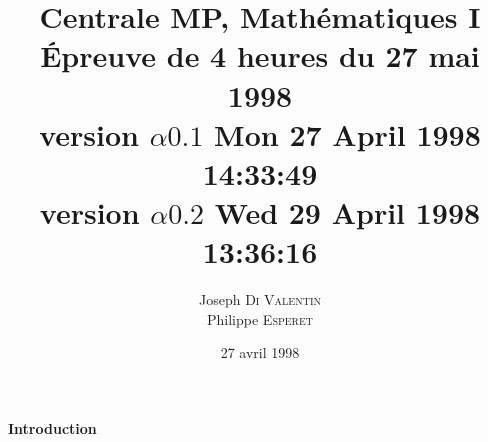 \documentclass[a4paper]{article}
\begin{document}

\def\RR{\mathbf{R}}
\def\ZZ{\mathbf{Z}}
\def\NN{\mathbf{N}}

\title{Centrale MP, Math\'ematiques I\\
       \'Epreuve de 4 heures du 27 mai 1998\\
       version $\alpha 0.1$ Mon 27 April 1998 14:33:49\\
       version $\alpha 0.2$ Wed 29 April 1998 13:36:16}

\author{Joseph \textsc{Di Valentin}\\
        Philippe \textsc{Esperet}}

\date{27 avril 1998}
\maketitle

\vspace*{3em}
\centerline{\textbf{\Large Introduction}}
\end{document}
